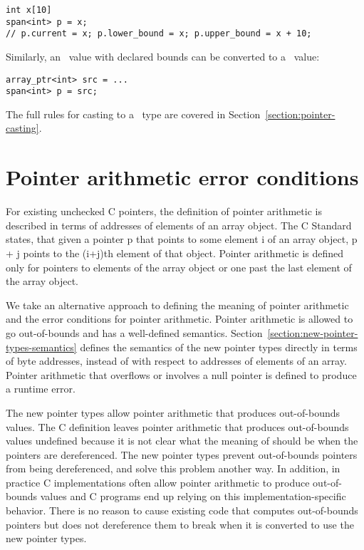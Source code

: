 \begin{verbatim}
int x[10]
span<int> p = x; 
// p.current = x; p.lower_bound = x; p.upper_bound = x + 10;

\end{verbatim}

Similarly, an \arrayptr\ value with declared bounds can be
converted to a \spanptr\ value:

\begin{verbatim}
array_ptr<int> src = ...
span<int> p = src;
\end{verbatim}

The full rules for casting to a \spanptr\ type are covered
in Section~\ref{section:pointer-casting}.

\section{Pointer arithmetic error conditions}
\label{section:pointer-arithmetic-errors}

For existing unchecked C pointers, the definition of pointer arithmetic is
described in terms of addresses of elements of an array object. The C
Standard \cite{ISO2011} states, that given a pointer p that points to some element i of
an array object, p + j points to the (i+j)th element of that object.
Pointer arithmetic is defined only for pointers to elements of the array
object or one past the last element of the array object.

We take an alternative approach to defining the meaning of pointer
arithmetic and the error conditions for pointer arithmetic. Pointer
arithmetic is allowed to go out-of-bounds and has a well-defined
semantics. Section~\ref{section:new-pointer-types-semantics}
defines the semantics of the new pointer types
directly in terms of byte addresses, instead of with respect to
addresses of elements of an array. Pointer arithmetic that overflows or
involves a null pointer is defined to produce a runtime error.

The new pointer types allow pointer arithmetic that produces
out-of-bounds values. The C definition leaves pointer arithmetic that
produces out-of-bounds values undefined because it is not clear what the
meaning of should be when the pointers are dereferenced. The new pointer
types prevent out-of-bounds pointers from being dereferenced, and solve
this problem another way. In addition, in practice C implementations
often allow pointer arithmetic to produce out-of-bounds values and C
programs end up relying on this implementation-specific behavior. There
is no reason to cause existing code that computes out-of-bounds pointers
but does not dereference them to break when it is converted to use the
new pointer types.

